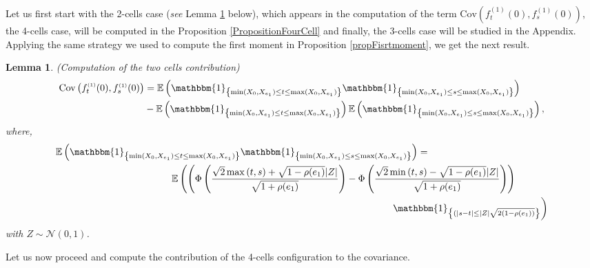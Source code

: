 \documentclass[12pt]{article}
\theoremstyle{Theorem}
\newtheorem{Lemma}[Theorem]{Lemma}
\theoremstyle{definition}
\begin{document}
Let us first start with the 2-cells case (\textit{see} Lemma \ref{2cells} below), which appears in the computation of the term $\text{Cov}\left(f_{t}^{\scriptscriptstyle (1)}(0), f_{s}^{\scriptscriptstyle (1)}(0)\right)$, the 4-cells case, will be computed in the Proposition \ref{PropositionFourCell} and finally, the 3-cells case will be studied in the Appendix. Applying the same strategy we used to compute the first moment in Proposition \ref{propFisrtmoment}, we get the next result. \\
\begin{Lemma}(Computation of the two cells contribution)
\label{2cells}
\begin{align*}
\text{Cov}\left(f_{t}^{\scriptscriptstyle (1)}(0), f_{s}^{\scriptscriptstyle (1)}(0)\right) & = \mathbb{E}\left(\mathbbm{1}_{\left\{\min(X_{\scriptscriptstyle 0}, X_{\scriptscriptstyle  e_1}) \leq t \leq \max(X_{\scriptscriptstyle 0}, X_{e_1})\right\}}\mathbbm{1}_{\left\{\min(X_{\scriptscriptstyle 0}, X_{ \scriptscriptstyle  e_1}) \leq s \leq \max(X_{\scriptscriptstyle 0}, X_{\scriptscriptstyle e_1}) \right\}}\right) \\
& - \mathbb{E}\left(\mathbbm{1}_{\left\{\min(X_{\scriptscriptstyle 0}, X_{e_1}) \leq t \leq \max(X_{\scriptscriptstyle 0}, X_{e_1})\right\}}\right)\mathbb{E}\left(\mathbbm{1}_{\left\{\min(X_{\scriptscriptstyle 0}, X_{e_1}) \leq s \leq \max(X_{\scriptscriptstyle 0}, X_{e_1})\right\}}\right),
\end{align*}
where, 
{\small
\begin{align*}
\mathbb{E}\left(\mathbbm{1}_{\left\{\min(X_{\scriptscriptstyle 0}, X_{\scriptscriptstyle  e_1}) \leq t \leq \max(X_{\scriptscriptstyle 0}, X_{e_1})\right\}}\mathbbm{1}_{\left\{\min(X_{\scriptscriptstyle 0}, X_{ \scriptscriptstyle  e_1}) \leq s \leq \max(X_{\scriptscriptstyle 0}, X_{\scriptscriptstyle e_1}) \right\}}\right) & = \\
& \hspace{-9cm}\mathbb{E}\left(\left(\Phi\left(\dfrac{\sqrt{2}\max\left(t,s\right) + \sqrt{1-\rho(e_1)}|Z|}{\sqrt{1+\rho(e_1)}}\right)  - \Phi\left(\dfrac{\sqrt{2}\min\left(t,s\right) - \sqrt{1-\rho(e_1)}|Z|}{\sqrt{1+\rho(e_1)}}\right)\right)\right. \\
& \hspace{-1cm} \left.\mathbbm{1}_{\left\{(|s-t| \leq |Z|\sqrt{2(1-\rho(e_1))}\right\}}\right)
\end{align*}}
with $Z \sim \mathcal{N}(0,1)$. 
\end{Lemma}
Let us now proceed and compute the contribution of the 4-cells configuration to the covariance.
\end{document}
